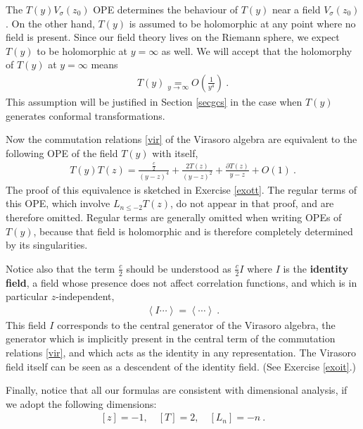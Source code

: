 \documentclass[12pt,a4paper,notitlepage]{report}
\numberwithin{equation}{section}
\theoremstyle{break}
\begin{document}
The $T(y)V_\sigma(z_0)$ OPE determines  the behaviour of $T(y)$ near a field $V_\sigma(z_0)$.
On the other hand, $T(y)$ is assumed to be holomorphic at any point where no field is present.
Since our field theory lives on the Riemann sphere, we expect $T(y)$ to be holomorphic at $y=\infty$ as well.
We will accept that the holomorphy of $T(y)$ at $y=\infty$ means
\begin{align}
 \boxed{T(y) \underset{y\rightarrow \infty}{=} O\left(\frac{1}{y^4}\right)}\ .
\label{tyi}
\end{align}
This assumption will be justified in Section \ref{secgcs} in the case when $T(y)$ generates conformal transformations.

Now the commutation relations \eqref{vir} of the Virasoro algebra are equivalent to the following OPE of the field $T(y)$ with itself,
\begin{align}
 \boxed{T(y)T(z) = \frac{\frac{c}{2}}{(y-z)^4} + \frac{2T(z)}{(y-z)^2} + \frac{\partial T(z)}{y-z} + O(1)}\ .
\label{tt}
\end{align}
The proof of this equivalence is sketched in Exercise \ref{exott}. 
The regular terms of this OPE, which involve $L_{n\leq -2} T(z)$, do not appear in that proof, and are therefore omitted. 
Regular terms are generally omitted when writing OPEs of $T(y)$, because that field is holomorphic and is therefore completely determined by its singularities. 

Notice also that the term $\frac{c}{2}$ should be understood as $\frac{c}{2}I$ where $I$ is the \textbf{\boldmath identity field}, a field whose presence does not affect correlation functions, and which is in particular $z$-independent,
\begin{align}
 \left\langle I \cdots \right\rangle = \left\langle \cdots \right\rangle \ .
\label{ivac}
\end{align}
This field $I$ corresponds to the central generator of the Virasoro algebra, the generator which is implicitly present in the central term of the commutation relations \eqref{vir}, and which acts as the identity in any representation.
The Virasoro field itself can be seen as a descendent of the identity field. (See Exercise \ref{exoit}.)

Finally, notice that all our formulas are consistent with dimensional analysis, if we adopt the following dimensions:
\begin{align}
 \boxed{[z]=-1,\quad [T]=2, \quad [L_n]=-n}\ .
\label{zaz}
\end{align}
\end{document}
